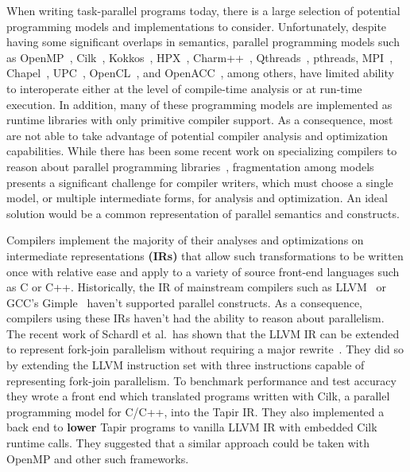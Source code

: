 \documentclass[sigconf]{acmart}
\newcommand{\wmnote}[1]{{\scriptsize \color{red} [[ Billy: #1]]}}
\newcommand{\gsnote}[1]{{\scriptsize \color{blue} [[ George: #1]]}}
\begin{document}
When writing task-parallel programs today, there is a large selection of
potential programming models and implementations to consider. Unfortunately,
despite having some significant overlaps in semantics, parallel programming
models such as OpenMP~\cite{openmp}, Cilk~\cite{cilk}, Kokkos~\cite{kokkos},
HPX~\cite{hpx}, Charm++~\cite{charm}, Qthreads~\cite{qthreads},
pthreads\cite{pthreads}, MPI~\cite{mpi}, Chapel~\cite{chapel}, UPC~\cite{upc},
OpenCL~\cite{opencl}, and OpenACC~\cite{openacc}, among others, have limited ability to
interoperate either at the level of compile-time analysis or at run-time
execution. In addition, many of these programming models are implemented as
runtime libraries with only primitive compiler support. As a consequence, most are
not able to take advantage of potential compiler analysis and optimization
capabilities.  While there has been some recent work on specializing
compilers to reason about parallel programming libraries~\cite{Moss_2016},
fragmentation among models presents a significant challenge for compiler
writers, which must choose a single model, or multiple intermediate forms, for
analysis and optimization. An ideal solution would be a
common representation of parallel semantics and constructs.



Compilers implement the majority of their analyses and optimizations on
intermediate representations \textbf{(IRs)} that allow such transformations
to be written once with relative ease and apply to a variety of source
front-end languages such as C or C++.  Historically, the IR of mainstream
compilers such as LLVM~\cite{lattner2004llvm} or GCC's
Gimple~\cite{merrill2003generic} haven't supported parallel constructs. As a
consequence, compilers using these IRs haven't had the ability to reason
about parallelism. The recent work of Schardl et al.\ has shown
that the LLVM IR can be extended to represent fork-join parallelism without
requiring a major rewrite~\cite{tapir}.  They did so by extending the LLVM instruction set
with three instructions capable of representing fork-join parallelism. To
benchmark performance and test accuracy they wrote a front end which translated
programs written with Cilk, a parallel programming model for C/C++, into the
Tapir IR. They also implemented a back end to \textbf{lower} Tapir programs to
vanilla LLVM IR with embedded Cilk runtime calls. They suggested that a similar
approach could be taken with OpenMP and other such frameworks.
\end{document}
